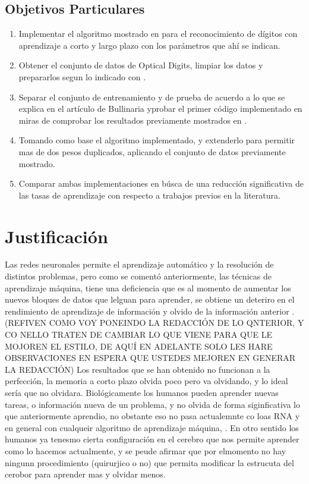     \subsection{Objetivos Particulares}
        \begin{enumerate}
            \item Implementar el algoritmo mostrado en \cite{Bullinaria2009} para el reconocimiento de dígitos con aprendizaje a corto y largo plazo con los parámetros que ahí se indican.
            \item Obtener el conjunto de datos de Optical Digits, limpiar los datos y prepararlos segun lo indicado con \cite{Bullinaria2009}.
            \item Separar el conjunto de entrenamiento y de prueba de acuerdo a lo que se explica en el artículo de Bullinaria yprobar el primer código implementado en miras de comprobar  los resultados previamente mostrados en \cite{Bullinaria2009}.
            \item Tomando como base el algoritmo implementado,  y extenderlo para permitir mas de dos pesos duplicados, aplicando el conjunto de datos previamente mostrado.
            \item Comparar ambas implementaciones en búsca de una reducción significativa de las tasas de aprendizaje con respecto a trabajos previos en la literatura.
        \end{enumerate}
\section{Justificaci\'on}

        Las redes neuronales permite el aprendizaje automático y la resoluci\'on de distintos problemas,  pero como se comentó anteriormente,  las técnicas de aprendizaje máquina, tiene una deficiencia que es al momento de aumentar los nuevos bloques de datos que lelguan para aprender,  se obtiene un deteriro en el rendimiento de aprendizaje de información y olvido de la información anterior \cite{Bullinaria2009}.   (REFIVEN COMO VOY PONEINDO LA REDACCIÓN DE LO QNTERIOR, Y CO NELLO TRATEN DE CAMBIAR LO QUE VIENE PARA QUE LE MOJOREN EL ESTILO, DE AQUÍ EN ADELANTE SOLO LES HARE OBSERVACIONES EN ESPERA QUE USTEDES MEJOREN EN GENERAR LA REDACCIÓN) Los 
        resultados que se han obtenido no funcionan a la perfección, la memoria a corto plazo olvida poco 
        pero va olvidando, y lo ideal sería que no olvidara. Biológicamente los humanos pueden aprender nuevas tareas, o información nueva de un problema, y no olvida de forma siginficativa lo que anteriormente aprendio, no obstante eso no pasa actualemnte co loas RNA y en general con cualqueir algoritmo de aprendizaje máquina, . En otro sentido los humanos ya tenesmo cierta configuración en el cerebro que nos permite aprender como lo hacemos actualmente,  y se peude afirmar que por elmomento no hay ningunn procedimiento (quirurjico o no) que permita modificar la estrucuta del cerobor para aprender mas y olvidar menos. 

